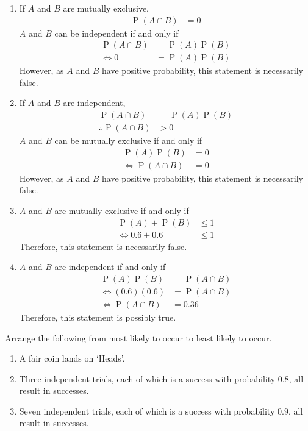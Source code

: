 \documentclass[fleqn, a4paper, 11pt, oneside]{amsart}
\theoremstyle{definition}
\theoremstyle{theorem}
\DeclareMathOperator{\prob}{\mathrm{P}}
\begin{document}
\begin{solution}
	\begin{enumerate}
		\item
			If $A$ and $B$ are mutually exclusive,
			\begin{align*}
				\prob(A \cap B) &= 0
			\end{align*}
			$A$ and $B$ can be independent if and only if
			\begin{align*}
				\prob(A \cap B) &= \prob(A) \prob(B)\\
				\iff 0 &= \prob(A) \prob(B)
			\end{align*}
			However, as $A$ and $B$ have positive probability, this statement is necessarily false.
		\item
			If $A$ and $B$ are independent,
			\begin{align*}
				\prob(A \cap B) &= \prob(A) \prob(B)\\
				\therefore \prob(A \cap B) &> 0
			\end{align*}
			$A$ and $B$ can be mutually exclusive if and only if
			\begin{align*}
				\prob(A) \prob(B) &= 0\\
				\iff \prob(A \cap B) &= 0
			\end{align*}
			However, as $A$ and $B$ have positive probability, this statement is necessarily false.
		\item
			$A$ and $B$ are mutually exclusive if and only if
			\begin{align*}
				\prob(A) + \prob(B) &\le 1\\
				\iff 0.6 + 0.6 &\le 1
			\end{align*}
			Therefore, this statement is necessarily false.
		\item
			$A$ and $B$ are independent if and only if
			\begin{align*}
				\prob(A) \prob(B) &= \prob(A \cap B)\\
				\iff (0.6) (0.6) &= \prob(A \cap B)\\
				\iff \prob(A \cap B) &= 0.36
			\end{align*}
			Therefore, this statement is possibly true.
	\end{enumerate}
\end{solution}

\begin{question}
	Arrange the following from most likely to occur to least likely to occur.
	\begin{enumerate}
		\item A fair coin lands on `Heads'.
		\item Three independent trials, each of which is a success with probability $0.8$, all result in successes.
		\item Seven independent trials, each of which is a success with probability $0.9$, all result in successes.
	\end{enumerate}
\end{question}
\end{document}
